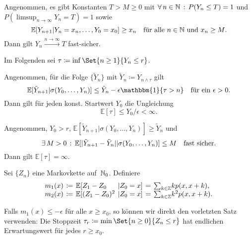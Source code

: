 \documentclass{cheat-sheet}
\newcommand{\E}{\mathbb{E}} %
\newcommand{\ind}{\mathbbm{1}} %
\begin{document}
\begin{satz}
  Angenommen, es gibt Konstanten $T > M \geq 0$ mit $\forall \, {n \in \mathbb{N}} \,:\, P(Y_n \leq T) = 1$ und $P({\limsup}_{n \to \infty} Y_n = T) = 1$ sowie
  \[
    \E[ Y_{n+1} | Y_n = x_n, \ldots, Y_0 = x_0 ] \geq x_n
    \quad \text{für alle $n \in \N$ und $x_n \geq M$.}
  \]
  Dann gilt $Y_n \xrightarrow{n \to \infty} T$ fast-sicher.
\end{satz}

Im Folgenden sei $\tau \coloneqq \inf \Set{n \geq 1}{Y_n \leq r}$.

\begin{satz}
  Angenommen, für die Folge $\{ \tilde{Y}_n \}$ mit $\tilde{Y}_n \coloneqq Y_{n \wedge \tau}$ gilt
  \[
    \E[ \tilde{Y}_{n+1} | \sigma(Y_0, \ldots, Y_n) ] \leq \tilde{Y}_n - \epsilon \ind \{ \tau > n \}
    \quad \text{für ein $\epsilon > 0$}.
  \]
  Dann gilt für jeden konst. Startwert $Y_0$ die Ungleichung
  \[ \E[\tau] \leq Y_0 / \epsilon < \infty. \]
\end{satz}

\begin{satz}
  Angenommen, $Y_0 > r$, $\E[ \tilde{Y}_{n+1} | \sigma(Y_0, \ldots, Y_n) ] \geq \tilde{Y}_n$ und
  \[
    \ex{M > 0}
    \E[ \abs{\tilde{Y}_{n+1} - \tilde{Y}_n} | \sigma(Y_0, \ldots, Y_n) ] \leq M
    \quad \text{fast sicher}.
  \]
  Dann gilt $\E[ \tau ] = \infty$.
\end{satz}



Sei $\{ Z_n \}$ eine Markovkette auf~$\mathbb{N}_0$.
Definiere
\[
  \arraycolsep=2pt
  \begin{array}{l l l l l l}
    m_1(x) &\coloneqq& \E[ Z_1 - Z_0 &| Z_0 = x ] &=& {\sum}_{k \in \Z} k p(x, x + k), \\
    m_2(x) &\coloneqq& \E[ (Z_1 - Z_0)^2 &| Z_0 = x ] &=& {\sum}_{k \in \Z} k^2 p(x, x + k).
  \end{array}
\]

\begin{bem}
  Falls $m_1(x) \leq - \epsilon$ für alle $x \geq x_0$, so können wir direkt den vorletzten Satz verwenden:
  Die Stoppzeit $\tau_r \coloneqq \min \Set{n \geq 0}{Z_n \leq r}$ hat endlichen Erwartungswert für jedes $r \geq x_0$.
\end{bem}
\end{document}
